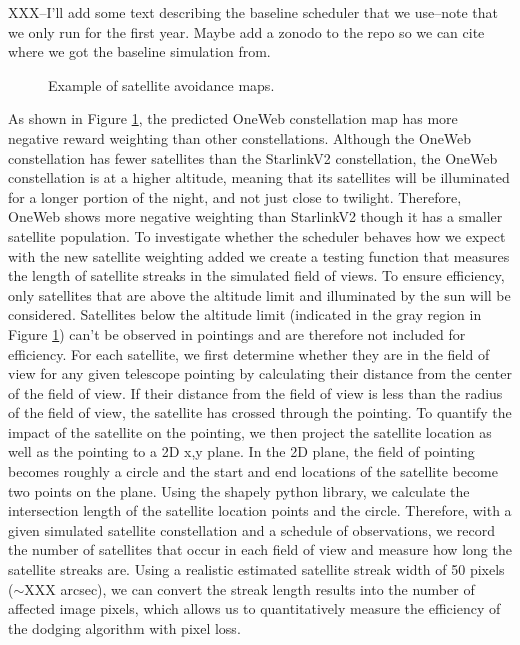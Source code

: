 \documentclass[linenumbers]{aastex631}
\begin{document}
XXX--I'll add some text describing the baseline scheduler that we use--note that we only run for the first year. Maybe add a zonodo to the repo so we can cite where we got the baseline simulation from.

\begin{figure}[ht!]
\caption{Example of satellite avoidance maps. \label{fig-simulated-scheduler}}
\end{figure}

As shown in Figure \ref{fig-simulated-scheduler}, the predicted OneWeb constellation map has more negative reward
weighting than other constellations. Although the OneWeb constellation has fewer satellites than
the StarlinkV2 constellation, the OneWeb constellation is at a higher altitude, meaning that its
satellites will be illuminated for a longer portion of the night, and not just close to twilight.
Therefore, OneWeb shows more negative weighting than StarlinkV2 though it has a smaller
satellite population.
To investigate whether the scheduler behaves how we expect with the new satellite
weighting added we create a testing function that measures the length of satellite streaks in the
simulated field of views. To ensure efficiency, only satellites that are above the altitude limit and
illuminated by the sun will be considered. Satellites below the altitude limit (indicated in the gray
region in Figure \ref{fig-simulated-scheduler}) can’t be observed in pointings and are therefore not included for efficiency.
For each satellite, we first determine whether they are in the field of view for any given
telescope pointing by calculating their distance from the center of the field of view. If their
distance from the field of view is less than the radius of the field of view, the satellite has crossed
through the pointing. To quantify the impact of the satellite on the pointing, we then project the satellite location as well as the pointing to a 2D x,y plane. In the 2D plane, the field of pointing
becomes roughly a circle and the start and end locations of the satellite become two points on the
plane. Using the shapely python library, we calculate the intersection length of the satellite location
points and the circle.
Therefore, with a given simulated satellite constellation and a schedule of observations,
we record the number of satellites that occur in each field of view and measure how long the
satellite streaks are. Using a realistic estimated satellite streak width of 50 pixels ($\sim$XXX arcsec), we can convert
the streak length results into the number of affected image pixels, which allows us to
quantitatively measure the efficiency of the dodging algorithm with pixel loss. 
\end{document}
